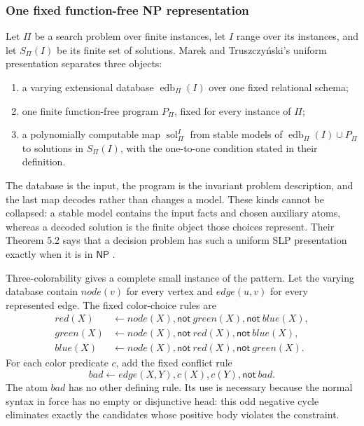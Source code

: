 \subsubsection{One fixed function-free NP representation}

Let \(\Pi\) be a search problem over finite instances, let \(I\) range over its
instances, and let \(S_\Pi(I)\) be its finite set of solutions.  Marek and Truszczyński's
uniform presentation separates three objects:
\begin{enumerate}
\item a varying extensional database \(\operatorname{edb}_{\Pi}(I)\) over one
  fixed relational schema;
\item one finite function-free program \(P_\Pi\), fixed for every instance of
  \(\Pi\);
\item a polynomially computable map \(\operatorname{sol}^{I}_{\Pi}\) from
  stable models of \(\operatorname{edb}_{\Pi}(I)\cup P_\Pi\) to solutions in
  \(S_\Pi(I)\), with the one-to-one condition stated in their definition.
\end{enumerate}
The database is the input, the program is the invariant problem description,
and the last map decodes rather than changes a model.  These kinds cannot be
collapsed: a stable model contains the input facts and chosen auxiliary atoms,
whereas a decoded solution is the finite object those choices represent.
Their Theorem 5.2 says that a decision problem has such a uniform SLP
presentation exactly when it is in \(\mathsf{NP}\)
\cite[\S5, thm.~5.2]{MarekTruszczynski1999}.

Three-colorability gives a complete small instance of the pattern.  Let the
varying database contain \(node(v)\) for every vertex and \(edge(u,v)\) for
every represented edge.  The fixed color-choice rules are
\[
\begin{aligned}
 red(X)&\leftarrow node(X),\mathsf{not}\ green(X),
                         \mathsf{not}\ blue(X),\\
 green(X)&\leftarrow node(X),\mathsf{not}\ red(X),
                           \mathsf{not}\ blue(X),\\
 blue(X)&\leftarrow node(X),\mathsf{not}\ red(X),
                          \mathsf{not}\ green(X).
\end{aligned}
\]
For each color predicate \(c\), add the fixed conflict rule
\[
 bad\leftarrow edge(X,Y),c(X),c(Y),\mathsf{not}\ bad.
\]
The atom \(bad\) has no other defining rule.  Its use is necessary because the
normal syntax in force has no empty or disjunctive head: this odd negative cycle
eliminates exactly the candidates whose positive body violates the constraint.

